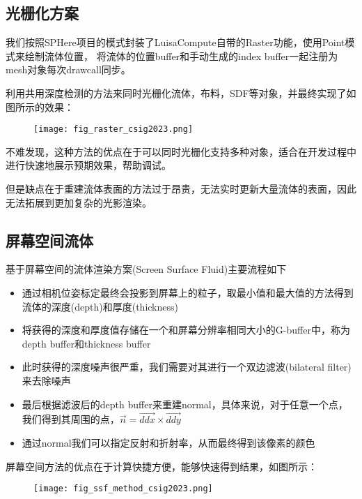 \subsection{光栅化方案}

我们按照SPHere项目的模式封装了LuisaCompute自带的Raster功能，使用Point模式来绘制流体位置，
将流体的位置buffer和手动生成的index buffer一起注册为mesh对象每次drawcall同步。

利用共用深度检测的方法来同时光栅化流体，布料，SDF等对象，并最终实现了如图所示的效果：

\begin{figure}[H]
	\centering
	\texttt{[image: fig\_raster\_csig2023.png]}
\end{figure}

不难发现，这种方法的优点在于可以同时光栅化支持多种对象，适合在开发过程中进行快速地展示预期效果，帮助调试。

但是缺点在于重建流体表面的方法过于昂贵，无法实时更新大量流体的表面，因此无法拓展到更加复杂的光影渲染。

\subsection{屏幕空间流体}

基于屏幕空间的流体渲染方案(Screen Surface Fluid)主要流程如下

\begin{itemize}
	\item 通过相机位姿标定最终会投影到屏幕上的粒子，取最小值和最大值的方法得到流体的深度(depth)和厚度(thickness)
	\item 将获得的深度和厚度值存储在一个和屏幕分辨率相同大小的G-buffer中，称为depth buffer和thickness buffer
	\item 此时获得的深度噪声很严重，我们需要对其进行一个双边滤波(bilateral filter)来去除噪声
	\item 最后根据滤波后的depth buffer来重建normal，具体来说，对于任意一个点，我们得到其周围的点，$\vec{n}=\vec{ddx} \times \vec{ddy}$
	\item 通过normal我们可以指定反射和折射率，从而最终得到该像素的颜色
\end{itemize}

屏幕空间方法的优点在于计算快捷方便，能够快速得到结果，如图所示：

\begin{figure}[H]
	\centering
	\texttt{[image: fig\_ssf\_method\_csig2023.png]}
\end{figure}


